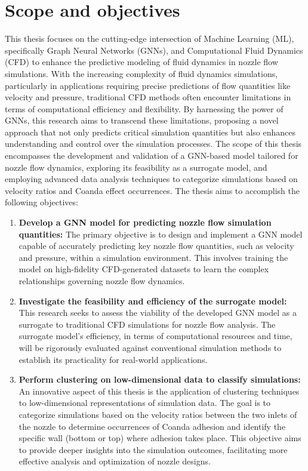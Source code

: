 \section{Scope and objectives}
This thesis focuses on the cutting-edge intersection of Machine Learning (ML), specifically Graph Neural Networks (GNNs), and Computational Fluid Dynamics (CFD) to enhance the predictive modeling of fluid dynamics in nozzle flow simulations. With the increasing complexity of fluid dynamics simulations, particularly in applications requiring precise predictions of flow quantities like velocity and pressure, traditional CFD methods often encounter limitations in terms of computational efficiency and flexibility. By harnessing the power of GNNs, this research aims to transcend these limitations, proposing a novel approach that not only predicts critical simulation quantities but also enhances understanding and control over the simulation processes. The scope of this thesis encompasses the development and validation of a GNN-based model tailored for nozzle flow dynamics, exploring its feasibility as a surrogate model, and employing advanced data analysis techniques to categorize simulations based on velocity ratios and Coanda effect occurrences. The thesis aims to accomplish the following objectives: 
\begin{enumerate}
\item \textbf{Develop a GNN model for predicting nozzle flow simulation quantities:} The primary objective is to design and implement a GNN model capable of accurately predicting key nozzle flow quantities, such as velocity and pressure, within a simulation environment. This involves training the model on high-fidelity CFD-generated datasets to learn the complex relationships governing nozzle flow dynamics.
\item \textbf{Investigate the feasibility and efficiency of the surrogate model:} This research seeks to assess the viability of the developed GNN model as a surrogate to traditional CFD simulations for nozzle flow analysis. The surrogate model's efficiency, in terms of computational resources and time, will be rigorously evaluated against conventional simulation methods to establish its practicality for real-world applications.

\item \textbf{Perform clustering on low-dimensional data to classify simulations:} An innovative aspect of this thesis is the application of clustering techniques to low-dimensional representations of simulation data. The goal is to categorize simulations based on the velocity ratios between the two inlets of the nozzle to determine occurrences of Coanda adhesion and identify the specific wall (bottom or top) where adhesion takes place. This objective aims to provide deeper insights into the simulation outcomes, facilitating more effective analysis and optimization of nozzle designs.
\end{enumerate}
